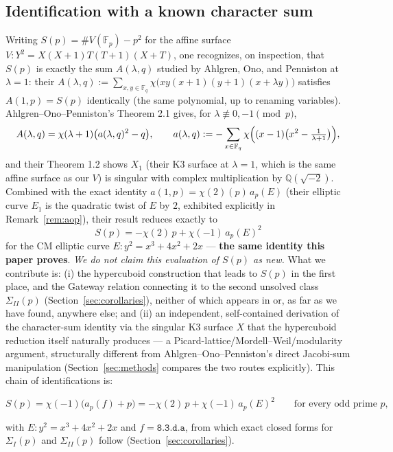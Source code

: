 \documentclass[11pt]{amsart}
\theoremstyle{definition}
\newcommand{\Fp}{\mathbb{F}_p}
\newcommand{\Fq}{\mathbb{F}_q}
\newcommand{\Q}{\mathbb{Q}}
\begin{document}
\subsection*{Identification with a known character sum}
Writing $S(p)=\#V(\Fp)-p^2$ for the affine surface $V:Y^2=X(X+1)T(T+1)(X+T)$, one recognizes, on inspection, that $S(p)$ is exactly the sum $A(\lambda,q)$ studied by Ahlgren, Ono, and Penniston \cite{AOP2002} at $\lambda=1$: their $A(\lambda,q):=\sum_{x,y\in\Fq}\chi\bigl(xy(x+1)(y+1)(x+\lambda y)\bigr)$ satisfies $A(1,p)=S(p)$ identically (the same polynomial, up to renaming variables). Ahlgren--Ono--Penniston's Theorem 2.1 gives, for $\lambda\not\equiv0,-1\pmod p$,
\[
A(\lambda,q)=\chi(\lambda+1)\bigl(a(\lambda,q)^2-q\bigr),\qquad a(\lambda,q):=-\sum_{x\in\Fq}\chi\Bigl((x-1)\bigl(x^2-\tfrac1{\lambda+1}\bigr)\Bigr),
\]
and their Theorem 1.2 shows $X_1$ (their K3 surface at $\lambda=1$, which is the same affine surface as our $V$) is singular with complex multiplication by $\Q(\sqrt{-2})$. Combined with the exact identity $a(1,p)=\chi(2)(p)\,a_p(E)$ (their elliptic curve $E_1$ is the quadratic twist of $E$ by $2$, exhibited explicitly in Remark~\ref{rem:aop}), their result reduces exactly to
\[
S(p)=-\chi(2)\,p+\chi(-1)\,a_p(E)^2
\]
for the CM elliptic curve $E:y^2=x^3+4x^2+2x$ — \textbf{the same identity this paper proves}. \emph{We do not claim this evaluation of $S(p)$ as new.} What we contribute is: (i) the hypercuboid construction that leads to $S(p)$ in the first place, and the Gateway relation connecting it to the second unsolved class $\Sigma_{II}(p)$ (Section~\ref{sec:corollaries}), neither of which appears in \cite{AOP2002} or, as far as we have found, anywhere else; and (ii) an independent, self-contained derivation of the character-sum identity via the singular K3 surface $X$ that the hypercuboid reduction itself naturally produces — a Picard-lattice/Mordell--Weil/modularity argument, structurally different from Ahlgren--Ono--Penniston's direct Jacobi-sum manipulation (Section~\ref{sec:methods} compares the two routes explicitly). This chain of identifications is:

\[
\boxed{S(p)=\chi(-1)\bigl(a_p(f)+p\bigr)=-\chi(2)\,p+\chi(-1)\,a_p(E)^2}
\qquad\text{for every odd prime }p,
\]

with $E:y^2=x^3+4x^2+2x$ and $f=\texttt{8.3.d.a}$, from which exact closed forms for $\Sigma_I(p)$ and $\Sigma_{II}(p)$ follow (Section~\ref{sec:corollaries}).
\end{document}
